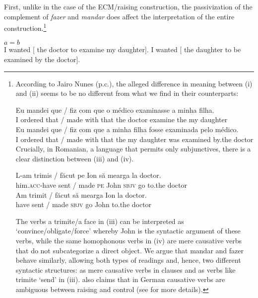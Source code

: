 \documentclass[output=paper]{langsci/langscibook}
\begin{document}
First, unlike in the case of the ECM\slash raising construction, the passivization of the complement of \textit{fazer} and \textit{mandar} does affect the interpretation of the entire construction.\footnote{According to Jairo Nunes (p.c.), the alleged difference in meaning between (i) and (ii) seems to be no different from what we find in their  counterparts: 

\ea \gll Eu mandei que / fiz      com que o    médico examinasse a    minha filha.\\
	I    ordered that / made with that         the doctor  examine      the my      daughter\\
\z
\ea
\gll Eu  mandei  que / fiz      com que a    minha filha        fosse examinada pelo     médico.\\
	I     ordered  that / made with that         the my     daughter  was   examined   by.the doctor\\
\z
Crucially, in Romanian, a language that permits only subjunctives, there is a clear distinction between (iii) and (iv). 

\ea \gll L-am              trimis / făcut     pe Ion   să     mearga la       doctor.\\
         him.\textsc{acc}-have sent / made      \textsc{pe} John \textsc{sbjv} go         to.the doctor\\
\z
\ea \gll Am trimit / făcut să     mearga Ion  la       doctor.\\
         have sent / made \textsc{sbjv} go        John to.the doctor\\
\z

The verbs a trimite\slash a face in (iii) can be interpreted as ‘convince\slash obligate\slash force’ whereby John is the syntactic  argument of these verbs, while the same homophonous verbs in (iv) are mere causative verbs that do not subcategorize a direct object. We argue that mandar and fazer behave similarly, allowing both types of readings and, hence, two different syntactic structures: as mere causative verbs in  clauses and as  verbs like trimite ‘send’ in (iii). \citet{Wurmbrand2001} also claims that in German causative verbs are ambiguous between raising and control (see \citet{Wurmbrand2001} for more details).}

\ea%
    $a = b$ \citep[119]{Farrell1995}\label{ex:moreno:9}\\
    \ea I wanted [ the doctor to examine my daughter].
    \ex I wanted [ the daughter to be examined by the doctor].
    \z
\z
\end{document}
